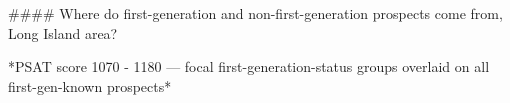 #### Where do first-generation and non-first-generation prospects come from, Long Island area?

*PSAT score 1070 - 1180 — focal first-generation-status groups overlaid on all first-gen-known prospects*
